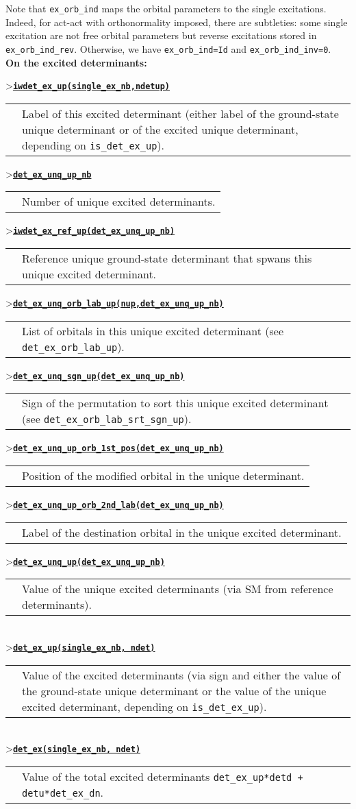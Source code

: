 \documentclass[letter,11pt]{article}
\renewcommand\line[2]{
  \noindent>\underline{\textbf{#1}}

  \noindent\begin{tabular}{p{.001\linewidth}p{.999\linewidth}}
    & \begin{minipage}{\linewidth}#2\end{minipage}
  \end{tabular}
  \vspace*{.2em}
}
\begin{document}
Note that {\tt ex_orb_ind} maps the orbital parameters to the single excitations.
Indeed, for act-act with orthonormality imposed, there are subtleties: some single excitation are not free orbital parameters but reverse excitations stored in {\tt ex_orb_ind_rev}.
Otherwise, we have {\tt ex_orb_ind=Id} and {\tt ex_orb_ind_inv=0}.
\\

\textbf{On the excited determinants:}


\line{{\tt iwdet_ex_up(single_ex_nb,ndetup)}}{Label of this excited determinant (either label of the ground-state unique determinant or of the excited unique determinant, depending on {\tt is_det_ex_up}).}
\line{{\tt det_ex_unq_up_nb}}{Number of unique excited determinants.}
\line{{\tt iwdet_ex_ref_up(det_ex_unq_up_nb)}}{Reference unique ground-state determinant that spwans this unique excited determinant.}
\line{{\tt det_ex_unq_orb_lab_up(nup,det_ex_unq_up_nb)}}{List of orbitals in this unique excited determinant (see {\tt det_ex_orb_lab_up}).}
\line{{\tt det_ex_unq_sgn_up(det_ex_unq_up_nb)}}{Sign of the permutation to sort this unique excited determinant (see {\tt det_ex_orb_lab_srt_sgn_up}).}
\line{{\tt det_ex_unq_up_orb_1st_pos(det_ex_unq_up_nb)}}{Position of the modified orbital in the unique determinant.}
\line{{\tt det_ex_unq_up_orb_2nd_lab(det_ex_unq_up_nb)}}{Label of the destination orbital in the unique excited determinant.}
\line{{\tt det_ex_unq_up(det_ex_unq_up_nb)}}{Value of the unique excited determinants (via SM from reference determinants).}
  \\
\line{{\tt det_ex_up(single_ex_nb, ndet)}}{Value of the excited determinants (via sign and either the value of the ground-state unique determinant or the value of the unique excited determinant, depending on {\tt is_det_ex_up}).}
  \\
\line{{\tt det_ex(single_ex_nb, ndet)}}{Value of the total excited determinants {\tt det_ex_up*detd + detu*det_ex_dn}.} 


{}


\end{document}
